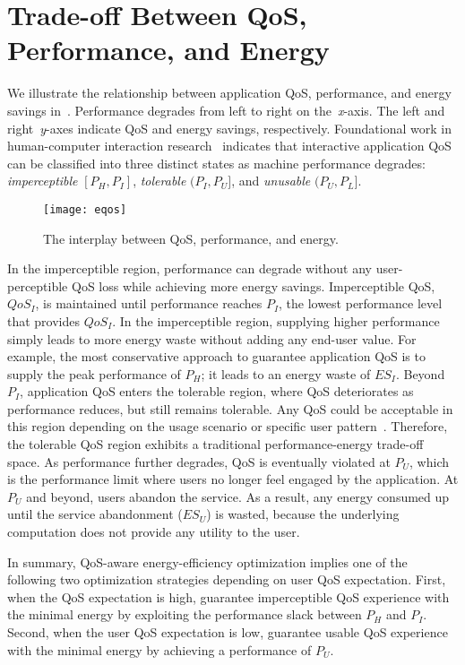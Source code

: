 \section{Trade-off Between QoS, Performance, and Energy}
\label{sec:lang:eqos}

We illustrate the relationship between application QoS, performance, and energy savings in~. Performance degrades from left to right on the~\textit{x}-axis. The left and right~\textit{y}-axes indicate QoS and energy savings, respectively. Foundational work in human-computer interaction research~\cite{eventlatency,designUI,info_vis,response_time,percent_done,usability_engineering} indicates that interactive application QoS can be classified into three distinct states as machine performance degrades: \textit{imperceptible} $[P_H,P_I]$, \textit{tolerable} $(P_I,P_U]$, and \textit{unusable} $(P_U,P_L]$.

\begin{figure}[t]
\centering
\captionsetup{width=.9\columnwidth}
\texttt{[image: eqos]}
\caption{The interplay between QoS, performance, and energy.}
\label{fig:eqos}
\end{figure}

In the imperceptible region, performance can degrade without any user-perceptible QoS loss while achieving more energy savings. Imperceptible QoS, $QoS_I$, is maintained until performance reaches $P_I$, the lowest performance level that provides $QoS_I$. In the imperceptible region, supplying higher performance simply leads to more energy waste without adding any end-user value. For example, the most conservative approach to guarantee application QoS is to supply the peak performance of $P_H$; it leads to an energy waste of $ES_I$. Beyond $P_I$, application QoS enters the tolerable region, where QoS deteriorates as performance reduces, but still remains tolerable. Any QoS could be acceptable in this region depending on the usage scenario or specific user pattern~\cite{usagepattern,satscore}. Therefore, the tolerable QoS region exhibits a traditional performance-energy trade-off space. As performance further degrades, QoS is eventually violated at $P_U$, which is the performance limit where users no longer feel engaged by the application. At $P_U$ and beyond, users abandon the service. As a result, any energy consumed up until the service abandonment ($ES_U$) is wasted, because the underlying computation does not provide any utility to the user.

In summary, QoS-aware energy-efficiency optimization implies one of the following two optimization strategies depending on user QoS expectation. First, when the QoS expectation is high, guarantee imperceptible QoS experience with the minimal energy by exploiting the performance slack between $P_H$ and $P_I$. Second, when the user QoS expectation is low, guarantee usable QoS experience with the minimal energy by achieving a performance of $P_U$.

